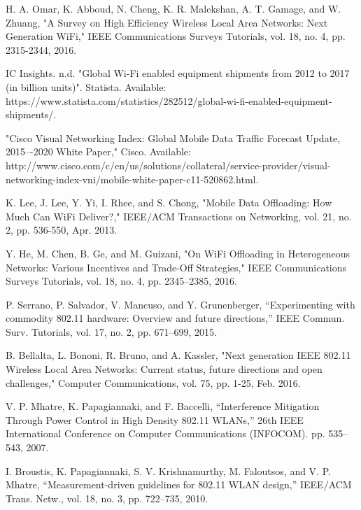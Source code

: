 
\begin{thebibliography}{1}

 H. A. Omar, K. Abboud, N. Cheng, K. R. Malekshan, A. T. Gamage, and W. Zhuang, "A Survey on High Efficiency Wireless Local Area Networks: Next Generation WiFi," IEEE Communications Surveys Tutorials, vol. 18, no. 4, pp. 2315-2344, 2016.

 IC Insights. n.d. "Global Wi-Fi enabled equipment shipments from 2012 to 2017 (in billion units)". Statista. Available: https://www.statista.com/statistics/282512/global-wi-fi-enabled-equipment-shipments/. 

 "Cisco Visual Networking Index: Global Mobile Data Traffic Forecast Update, 2015–-2020 White Paper," Cisco. Available: http://www.cisco.com/c/en/us/solutions/collateral/service-provider/visual-networking-index-vni/mobile-white-paper-c11-520862.html.

 K. Lee, J. Lee, Y. Yi, I. Rhee, and S. Chong, "Mobile Data Offloading: How Much Can WiFi Deliver?," IEEE/ACM Transactions on Networking, vol. 21, no. 2, pp. 536-550, Apr. 2013.

 Y. He, M. Chen, B. Ge, and M. Guizani, "On WiFi Offloading in Heterogeneous Networks: Various Incentives and Trade-Off Strategies," IEEE Communications Surveys Tutorials, vol. 18, no. 4, pp. 2345–2385, 2016.

 P. Serrano, P. Salvador, V. Mancuso, and Y. Grunenberger, “Experimenting with commodity 802.11 hardware: Overview and future directions,” IEEE Commun. Surv. Tutorials, vol. 17, no. 2, pp. 671–699, 2015.

 B. Bellalta, L. Bononi, R. Bruno, and A. Kassler, "Next generation IEEE 802.11 Wireless Local Area Networks: Current status, future directions and open challenges," Computer Communications, vol. 75, pp. 1-25, Feb. 2016.



 V. P. Mhatre, K. Papagiannaki, and F. Baccelli, “Interference Mitigation Through Power Control in High Density 802.11 WLANs,” 26th IEEE International Conference on Computer Communications (INFOCOM). pp. 535–543, 2007.


 I. Broustis, K. Papagiannaki, S. V. Krishnamurthy, M. Faloutsos, and V. P. Mhatre, “Measurement-driven guidelines for 802.11 WLAN design,” IEEE/ACM Trans. Netw., vol. 18, no. 3, pp. 722–735, 2010.


\end{thebibliography}
